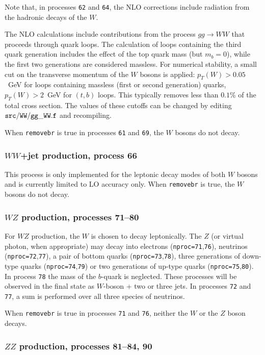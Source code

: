 Note that, in processes
{\tt 62} and {\tt 64}, the NLO corrections include radiation from the
hadronic decays of the $W$.

The NLO calculations include contributions from the process $gg \to WW$
that proceeds through quark loops. The calculation of loops containing the third quark generation
includes the effect of the top quark mass (but $m_b=0$), while the first two
generations are considered massless. For numerical stability, a small cut on the
transverse momentum of the $W$ bosons is applied: $p_T(W)>0.05$~GeV for loops
containing massless (first or second generation) quarks, $p_T(W)>2$~GeV for $(t,b)$
loops. This typically removes less than $0.1$\% of the total cross section. The
values of these cutoffs can be changed by editing ${\tt src/WW/gg\_WW.f}$ and recompiling.

When {\tt removebr} is true in processes {\tt 61} and {\tt 69},
the $W$ bosons do not decay.

\subsubsection{$WW$+jet production, process 66}

This process is only implemented for the leptonic decay modes of both $W$
bosons and is currently limited to LO accuracy only. When {\tt removebr} is true,
the $W$ bosons do not decay.

\subsubsection{$WZ$ production, processes 71--80}

For $WZ$ production, the $W$ is chosen to decay leptonically. The $Z$ (or
virtual photon, when appropriate) may decay into electrons
({\tt nproc=71},{\tt 76}), neutrinos ({\tt nproc=72},{\tt 77}), a
pair of bottom quarks ({\tt nproc=73},{\tt 78}), three generations of down-type
quarks ({\tt nproc=74},{\tt 79}) or two generations of up-type quarks ({\tt nproc=75},{\tt 80}).
In process {\tt 78} the mass of the $b$-quark is neglected.
These processes will be observed
in the final state as $W$-boson + two or three jets.
In processes {\tt 72} and {\tt 77}, a sum is performed over all three species of neutrinos.

When {\tt removebr} is true in processes {\tt 71} and {\tt 76},
neither the $W$ or the $Z$ boson decays.

\subsubsection{$ZZ$ production, processes 81--84, 90}

